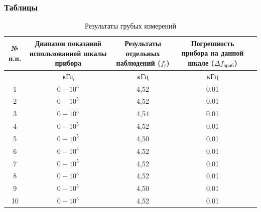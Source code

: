 \clearpage
\subsubsection{Таблицы}
\begin{center}
\begin{table}[h!]
\centering
\caption{Результаты грубых измерений}
\label{tabl:1}
\begin{tabular}{|c|c|c|c|c|}
\hline
\begin{minipage}{7mm}
    № п.п. 
\end{minipage}&
\begin{minipage}{5cm}
    Диапазон показаний использованной шкалы прибора
\end{minipage} &
\begin{minipage}{5cm}
    Результаты отдельных наблюдений ($f_i$)
\end{minipage} &
\begin{minipage}{5cm}
    Погрешность прибора на данной шкале ($\Delta f_{\text{приб}}$)
\end{minipage}\\
\hline
{}&кГц&кГц&кГц\\
\hline
1 &	$0-10^5$ &	4,52 & 0.01 \\
2 &	$0-10^5$ &	4,52 & 0.01 \\
3 &	$0-10^5$ &	4,54 & 0.01 \\
4 &	$0-10^5$ &	4,52 & 0.01 \\
5 & $0-10^5$ &	4,50 & 0.01 \\
6 & $0-10^5$ &	4,52 & 0.01 \\
7 & $0-10^5$ &	4,52 & 0.01 \\
8 & $0-10^5$ &	4,52 & 0.01 \\
9 & $0-10^5$ &	4,50 & 0.01 \\
10& $0-10^5$ &	4,52 & 0.01 \\
\hline
\end{tabular}
\end{table}
\end{center}

